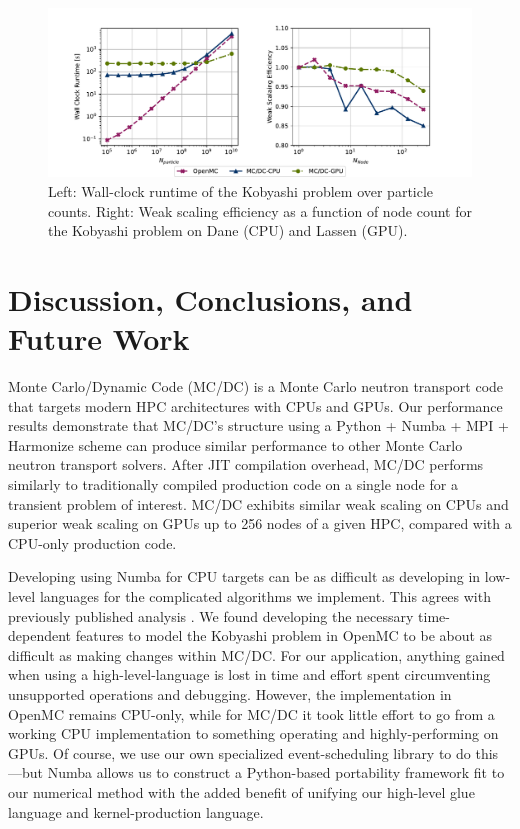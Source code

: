 \begin{figure}[h]
    \centerline{
    \includegraphics[width=1.1\textwidth]{figures/cise_figs/comps.pdf}
    }
    \caption{Left: Wall-clock runtime of the Kobyashi problem over particle counts. 
    Right: Weak scaling efficiency as a function of node count for the Kobyashi problem on Dane (CPU) and Lassen (GPU).}
    \label{performance_results}
\end{figure}

\section{Discussion, Conclusions, and Future Work}

Monte Carlo/Dynamic Code (MC/DC) is a Monte Carlo neutron transport code that targets modern HPC architectures with CPUs and GPUs.
Our performance results demonstrate that MC/DC's structure using a Python + Numba + MPI + Harmonize scheme can produce similar performance to other Monte Carlo neutron transport solvers.
After JIT compilation overhead, MC/DC performs similarly to traditionally compiled production code on a single node for a transient problem of interest.
MC/DC exhibits similar weak scaling on CPUs and superior weak scaling on GPUs up to 256 nodes of a given HPC, compared with a CPU-only production code.

Developing using Numba for CPU targets can be as difficult as developing in low-level languages for the complicated algorithms we implement. 
This agrees with previously published analysis \cite{KailasaSrinath2022PAEi}.
We found developing the necessary time-dependent features to model the Kobyashi problem in OpenMC to be about as difficult as making changes within MC/DC.
For our application, anything gained when using a high-level-language is lost in time and effort spent circumventing unsupported operations and debugging. 
However, the implementation in OpenMC remains CPU-only, while for MC/DC it took little effort to go from a working CPU implementation to something operating and highly-performing on GPUs.
Of course, we use our own specialized event-scheduling library to do this---but Numba allows us to construct a Python-based portability framework fit to our numerical method with the added benefit of unifying our high-level glue language and kernel-production language.

